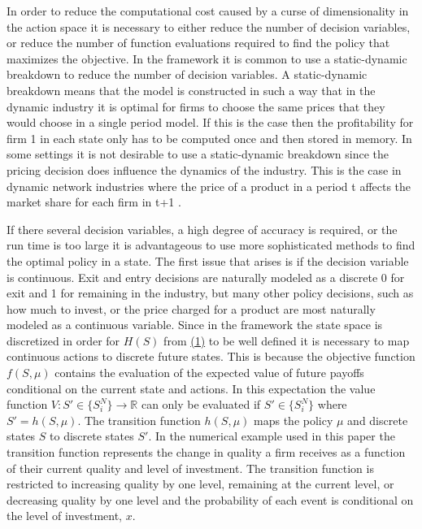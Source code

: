 \documentclass[12pt]{article}
\begin{document}
In order to reduce the computational cost caused by a curse of dimensionality in the action space it is necessary to either reduce the number of decision variables, or reduce the number of function evaluations required to find the policy that maximizes the objective. In the \citet{1995_Erickson_Pakes_RES} framework it is common to use a static-dynamic breakdown to reduce the number of decision variables. A static-dynamic breakdown means that the model is constructed in such a way that in the dynamic industry it is optimal for firms to choose the same prices that they would choose in a single period model. If this is the case then the profitability for firm 1 in each state only has to be computed once and then stored in memory. In some settings it is not desirable to use a static-dynamic breakdown since the pricing decision does influence the dynamics of the industry. This is the case in dynamic network industries where the price of a product in a period t affects the market share for each firm in t+1 \citep{2009_Chen_Doraszelski_Harrington, 2006_Mitchell_Skrzypacz, 2006_Chen_Doraszelski}.

If there several decision variables, a high degree of accuracy is required, or the run time is too large it is advantageous to use more sophisticated methods to find the optimal policy in a state. The first issue that arises is if the decision variable is continuous. Exit and entry decisions are naturally modeled as a discrete 0 for exit and 1 for remaining in the industry, but many other policy decisions, such as how much to invest, or the price charged for a product are most naturally modeled as a continuous variable. Since in the \citet{1995_Erickson_Pakes_RES} framework the state space is discretized in order for $H(S)$ from \hyperref[runtime]{(1)} to be well defined it is necessary to map continuous actions to discrete future states. This is because the objective function $f(S,\mu)$ contains the evaluation of the expected value of future payoffs conditional on the current state and actions. In this expectation the value function $V : S' \in \{S_i^N\} \rightarrow \mathbb{R}$ can only be evaluated if $S' \in \{S_i^N\}$ where $S'=h(S,\mu)$. The transition function $h(S,\mu)$ maps the policy $\mu$ and discrete states $S$ to discrete states $S'$. In the numerical example used in this paper the transition function represents the change in quality a firm receives as a function of their current quality and level of investment. The transition function is restricted to increasing quality by one level, remaining at the current level, or decreasing quality by one level and the probability of each event is conditional on the level of investment, $x$.
\end{document}
